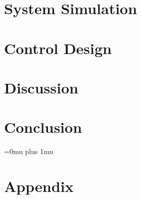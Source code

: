 \chapter{System Simulation}\label{ch:lab}

\clearpage

\chapter{Control Design}\label{ch:lab}

\clearpage

\chapter{Discussion}


\clearpage
\chapter{Conclusion}


\clearpage
\Urlmuskip=0mu plus 1mu\relax
\sloppy

{}

\chapter{Appendix}\label{ch:appendix}




